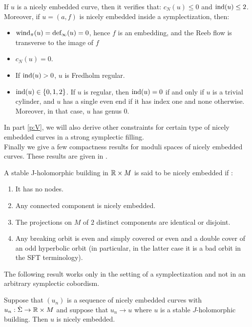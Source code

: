 \documentclass[../main.tex]{subfiles}
\begin{document}
\begin{lemma}\label{l:properties_nice}
If $u$ is a nicely embedded curve, then it verifies that: $c_N(u) \leq 0$ and $\text{ind}(u) \leq 2$. \\
Moreover, if $u = (a,f)$ is nicely embedded inside a symplectization, then:

\begin{itemize}
    \item $\text{wind}_\pi(u) = \text{def}_\infty(u) = 0$, hence $f$ is an embedding, and the Reeb flow is transverse to the image of $f$
    \item $c_N(u) = 0$.
    \item If $\text{ind}(u)> 0$, $u$ is Fredholm regular.
    \item $\text{ind}(u) \in\{0,1,2\}$. If $u$ is regular, then $\text{ind}(u) = 0$ if and only if $u$ is a trivial cylinder, and $u$ has a single even end if it has index one and none otherwise. Moreover, in that case, $u$ has genus $0$. 
\end{itemize}
\end{lemma}

In part \ref{p:V}, we will also derive other constraints for certain type of nicely embedded curves in a strong symplectic filling.\\

Finally we give a few compactness results for moduli spaces of nicely embedded curves. These results are given in \cite{wendl_compactness_2008}.

\begin{definition}
    A stable J-holomorphic building in $\mathbb{R}\times M$ is said to be nicely embedded if :
    \begin{enumerate}
        \item It has no nodes.
        \item Any connected component is nicely embedded.
        \item The projections on $M$ of $2$ distinct components are identical or disjoint.
        \item Any breaking orbit is even and simply covered or even and a double cover of an odd hyperbolic orbit (in particular, in the latter case it is a bad orbit in the SFT terminology).
    \end{enumerate}
\end{definition}

\noindent The following result works only in the setting of a symplectization and not in an arbitrary symplectic cobordism.

\begin{theorem}\label{t:compactness_nice}
    Suppose that $(u_n)$ is a sequence of nicely embedded curves with $u_n : \dot\Sigma \rightarrow \mathbb{R}\times M$ and suppose that $u_n\rightarrow u$ where $u$ is a stable $J$-holomorphic building. Then $u$ is nicely embedded.
\end{theorem}
\end{document}
